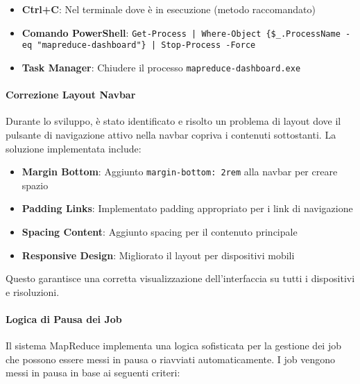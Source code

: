 \documentclass[12pt,a4paper]{article}
\begin{document}
\begin{itemize}
\item \textbf{Ctrl+C}: Nel terminale dove è in esecuzione (metodo raccomandato)
\item \textbf{Comando PowerShell}: \texttt{Get-Process | Where-Object \{\$_.ProcessName -eq "mapreduce-dashboard"\} | Stop-Process -Force}
\item \textbf{Task Manager}: Chiudere il processo \texttt{mapreduce-dashboard.exe}
\end{itemize}

\paragraph{Correzione Layout Navbar}
Durante lo sviluppo, è stato identificato e risolto un problema di layout dove il pulsante di navigazione attivo nella navbar copriva i contenuti sottostanti. La soluzione implementata include:

\begin{itemize}
\item \textbf{Margin Bottom}: Aggiunto \texttt{margin-bottom: 2rem} alla navbar per creare spazio
\item \textbf{Padding Links}: Implementato padding appropriato per i link di navigazione
\item \textbf{Spacing Content}: Aggiunto spacing per il contenuto principale
\item \textbf{Responsive Design}: Migliorato il layout per dispositivi mobili
\end{itemize}

Questo garantisce una corretta visualizzazione dell'interfaccia su tutti i dispositivi e risoluzioni.

\paragraph{Logica di Pausa dei Job}
Il sistema MapReduce implementa una logica sofisticata per la gestione dei job che possono essere messi in pausa o riavviati automaticamente. I job vengono messi in pausa in base ai seguenti criteri:
\end{document}
